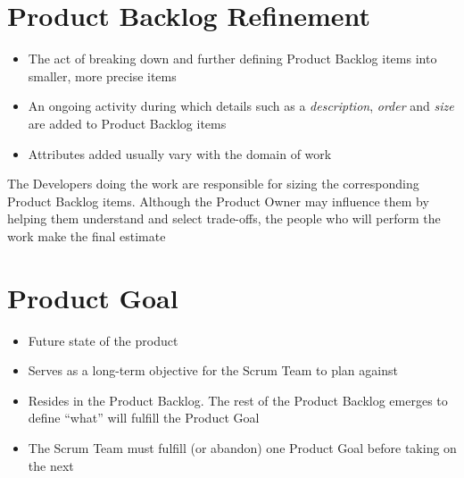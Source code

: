 \documentclass[a4paper,11pt,twocolumn]{article}
\begin{document}
\section*{Product Backlog Refinement}
\begin{itemize}
	\item The act of breaking down and further defining Product Backlog items into smaller, more precise items
	\item An ongoing activity during which details such as a \textit{description}, \textit{order} and \textit{size} are added to Product Backlog items 
	\item Attributes added usually vary with the domain of work
\end{itemize}

\begin{tcolorbox}[colback=black!8!white,colframe=gray!50!black,title=Note,sharp corners,fonttitle=\normalsize\bfseries,fontupper=\normalsize,left=0.7em,right=0.7em]
	The Developers doing the work are responsible for sizing the corresponding Product Backlog items. Although the Product Owner may influence them by helping them understand and select trade-offs, the people who will perform the work make the final estimate
\end{tcolorbox}

\section*{Product Goal}
\begin{itemize}
	\item Future state of the product 
	\item Serves as a long-term objective for the Scrum Team to plan against
	\item Resides in the Product Backlog. The rest of the Product Backlog emerges to define ``what'' will fulfill the Product Goal
	\item The Scrum Team must fulfill (or abandon) one Product Goal before taking on the next
\end{itemize}
\end{document}
